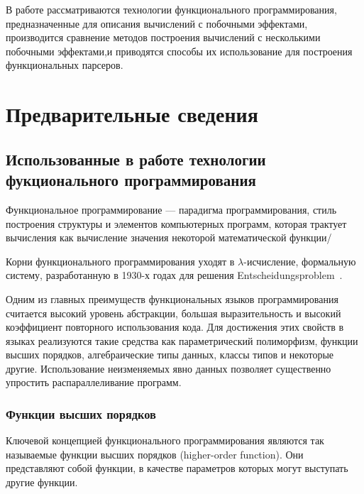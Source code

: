



\usepackage{float}



\Intro
В работе рассматриваются технологии функционального программирования, предназначенные для описания вычислений с побочными эффектами, производится сравнение методов построения вычислений с несколькими побочными эффектами,и приводятся способы их использование для построения функциональных парсеров.   

\section{Предварительные сведения}

\subsection{Использованные в работе технологии фукционального программирования}

Функциональное программирование --- парадигма программирования, стиль построения структуры и элементов компьютерных программ, которая трактует вычисления как вычисление значения некоторой математической функции/

Корни функционального программирования уходят в $\lambda$-исчисление, формальную систему, разработанную в 1930-х годах для решения Entscheidungsproblem~\autocite{Entscheidungsproblem}.

Одним из главных преимуществ функциональных языков программирования считается высокий уровень абстракции, большая выразительность и высокий коэффициент повторного использования кода. Для достижения этих свойств в языках реализуются такие средства как параметрический полиморфизм, функции высших порядков, алгебраические типы данных, классы типов и некоторые другие. Использование неизменяемых явно данных позволяет существенно упростить распараллеливание программ. 

\subsubsection{Функции высших порядков}
Ключевой концепцией функционального программирования являются так называемые функции высших порядков (higher-order function). Они представляют собой функции, в качестве параметров которых могут выступать другие функции. 

